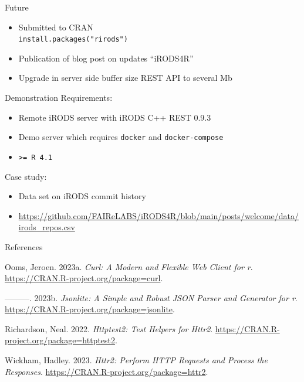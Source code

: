 \documentclass[
  ignorenonframetext,
]{beamer}
\providecommand{\tightlist}{%
  \setlength{\itemsep}{0pt}\setlength{\parskip}{0pt}}\usepackage{longtable,booktabs,array}
\newlength{\cslhangindent}
\newlength{\cslentryspacingunit} %
\newenvironment{CSLReferences}[2] %
 {%
  \setlength{\parindent}{0pt}
  \ifodd #1
  \let\oldpar\par
  \def\par{\hangindent=\cslhangindent\oldpar}
  \fi
  \setlength{\parskip}{#2\cslentryspacingunit}
 }%
 {}
\begin{document}
\begin{frame}{}
\protect\hypertarget{section}{}
\end{frame}

\begin{frame}[fragile]{Future}
\protect\hypertarget{future}{}
\begin{itemize}
\tightlist
\item
  Submitted to CRAN\\
  \texttt{install.packages("rirods")}
\item
  Publication of blog post on updates ``iRODS4R''
\item
  Upgrade in server side buffer size REST API to several Mb
\end{itemize}
\end{frame}

\begin{frame}[fragile]{Demonstration}
\protect\hypertarget{demonstration}{}
Requirements:

\begin{itemize}
\tightlist
\item
  Remote iRODS server with iRODS C++ REST 0.9.3
\item
  Demo server which requires \texttt{docker} and \texttt{docker-compose}
\item
  \texttt{\textgreater{}=\ R\ 4.1}
\end{itemize}

Case study:

\begin{itemize}
\tightlist
\item
  Data set on iRODS commit history
\item
  \url{https://github.com/FAIReLABS/iRODS4R/blob/main/posts/welcome/data/irods_repos.csv}
\end{itemize}
\end{frame}

\begin{frame}{References}
\protect\hypertarget{references}{}
\hypertarget{refs}{}
\begin{CSLReferences}{1}{0}
\leavevmode{}%
Ooms, Jeroen. 2023a. \emph{Curl: A Modern and Flexible Web Client for
r}. \url{https://CRAN.R-project.org/package=curl}.

\leavevmode{}%
---------. 2023b. \emph{Jsonlite: A Simple and Robust JSON Parser and
Generator for r}. \url{https://CRAN.R-project.org/package=jsonlite}.

\leavevmode{}%
Richardson, Neal. 2022. \emph{Httptest2: Test Helpers for Httr2}.
\url{https://CRAN.R-project.org/package=httptest2}.

\leavevmode{}%
Wickham, Hadley. 2023. \emph{Httr2: Perform HTTP Requests and Process
the Responses}. \url{https://CRAN.R-project.org/package=httr2}.

\end{CSLReferences}
\end{frame}
\end{document}
